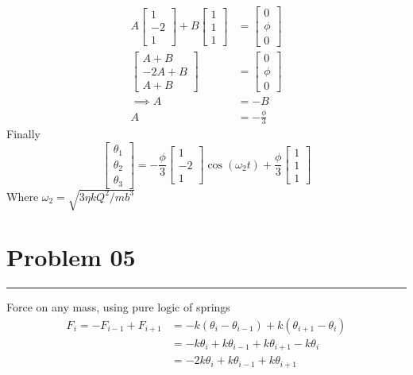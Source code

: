 \documentclass[letter, 10pts]{article}
\begin{document}
\begin{align*}
A \begin{bmatrix} 1 \\ -2 \\ 1 \end{bmatrix} 
+ B \begin{bmatrix} 1\\1\\1 \end{bmatrix}  &=  
\begin{bmatrix} 0 \\ \phi \\ 0 \end{bmatrix}  \\ 
\begin{bmatrix} A  + B \\ 
-2 A  + B \\ 
A + B\end{bmatrix}  &= 
\begin{bmatrix} 0 \\ \phi \\ 0 \end{bmatrix}  \\
\implies A &= - B 
\\
A &= - \frac{\phi}{3}
\end{align*}
Finally
\[
\begin{bmatrix} \theta_1 \\ \theta_2 \\\theta_3  \end{bmatrix} 
=
- \frac{\phi}{3}\begin{bmatrix} 1 \\ - 2 \\ 1 \end{bmatrix} 
\cos(\omega_2 t) 
+ \frac{\phi}{3} \begin{bmatrix} 1 \\ 1 \\ 1 \end{bmatrix}  \] 
Where $\omega_2 = \sqrt{3 \eta k Q^2 / m b^3} $

\newpage
\section*{Problem 05} 
\hrule
Force on any mass, using pure logic of springs 
\begin{align*}
	F_i = - F_{i-1} + F_{i+1} &= -k (\theta_i - \theta_{i-1} ) + k(\theta_{i+1} - \theta_i) \\
				  &= - k \theta_i + k \theta_{i-1} + k \theta_{i+1} - k \theta_i \\
				  &= -2 k \theta_i + k \theta_{i-1} + k \theta_{i+1}  
\end{align*}
\end{document}
